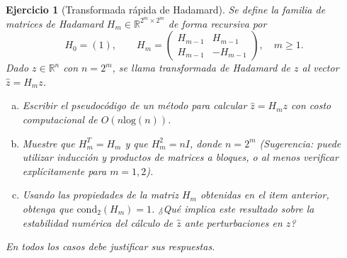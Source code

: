 \documentclass[12pt]{article}%
\def\R{\mathbb{R}}
\newtheorem{exercise}{Ejercicio}
\begin{document}
\begin{exercise}[Transformada rápida de Hadamard]
Se define la familia de matrices de Hadamard $H_m\in\R^{2^m\times 2^m}$ de forma recursiva por
\[
H_0 = (1), \qquad
H_m = \begin{pmatrix} H_{m-1} & H_{m-1} \\ H_{m-1} & -H_{m-1} \end{pmatrix}, \quad m\ge 1.
\]
Dado $z\in\R^{n}$ con $n=2^m$, se llama \emph{transformada de Hadamard} de $z$ al vector $\hat{z} = H_m z$.

\begin{enumerate}[(a)]
\item Escribir el pseudocódigo de un método para calcular $\hat{z} = H_m z$ con costo computacional de $O(n \mathrm{log}(n))$.

\item Muestre que $H_m^T = H_m$ y que $H_m^2 = nI$, donde $n = 2^m$ (Sugerencia: puede utilizar inducción y productos de matrices a bloques, o al menos verificar explícitamente para $m=1,2$). 

\item Usando las propiedades de la matriz $H_m$ obtenidas en el item anterior, obtenga que $\mathrm{cond}_2(H_m)=1$. ¿Qué implica este resultado sobre la estabilidad numérica del cálculo de $\hat{z}$ ante perturbaciones en $z$?
\end{enumerate}
\end{exercise}


\vskip 2.5cm
\begin{center}
    \textit{En todos los casos debe justificar sus respuestas.}
\end{center}
\end{document}
